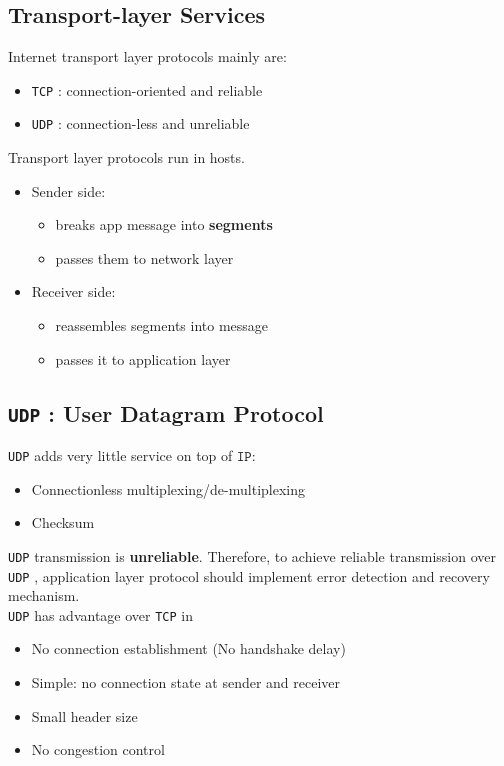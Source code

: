 \documentclass[12pt]{article}
\newcommand\TCP{\texttt{TCP} }
\newcommand\UDP{\texttt{UDP} }
\theoremstyle{definition}
\begin{document}
\subsection{Transport-layer Services}
Internet transport layer protocols mainly are:
\begin{itemize}
  \item \TCP: connection-oriented and reliable
  \item \UDP: connection-less and unreliable
\end{itemize}
Transport layer protocols run in hosts.
\begin{itemize}
  \item Sender side:
  \begin{itemize}
    \item breaks app message into \textbf{segments}
    \item passes them to network layer
  \end{itemize}
  \item Receiver side:
  \begin{itemize}
    \item reassembles segments into message
    \item passes it to application layer
  \end{itemize}
\end{itemize}
\subsection{\UDP: User Datagram Protocol}
\UDP adds very little service on top of $\texttt{IP}$:
\begin{itemize}
  \item Connectionless multiplexing/de-multiplexing
  \item Checksum
\end{itemize}
\UDP transmission is \textbf{unreliable}. Therefore, to achieve reliable transmission over \UDP, application layer protocol should implement error detection and recovery mechanism.\\
\UDP has advantage over \TCP in
\begin{itemize}
  \item No connection establishment (No handshake delay)
  \item Simple: no connection state at sender and receiver
  \item Small header size
  \item No congestion control
\end{itemize}
\end{document}
